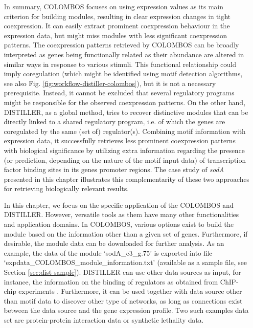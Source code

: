 In summary, COLOMBOS focuses on using expression values as its main criterion
for building modules, resulting in clear expression changes in tight
coexpression. It can easily extract prominent coexpression behaviour in the
expression data, but might miss modules with less significant coexpression
patterns. The coexpression patterns retrieved by COLOMBOS can be broadly
interpreted as genes being functionally related as their abundance are altered
in similar ways in response to various stimuli. This functional relationship
could imply coregulation (which might be identified using motif detection
algorithms, see also Fig. \ref{fig:workflow-distiller-colombos}), but it is not
a necessary prerequisite.
Instead, it cannot be excluded that several regulatory programs might be 
responsible for the observed coexpression patterns.
On the other hand, DISTILLER, as a global method, tries to recover
distinctive modules that can be directly linked to a shared regulatory
program, i.e. of which the genes are coregulated by the same (set of)
regulator(s). Combining motif information with expression data, it
successfully retrieves less prominent coexpression patterns with
biological significance by utilizing extra information regarding the
presence (or prediction, depending on the nature of the motif input
data) of transcription factor binding sites in its genes promoter
regions. The case study of \textit{sodA} presented in this chapter illustrates 
this complementarity of these two approaches for retrieving biologically 
relevant results. 

In this chapter, we focus on the specific application of the COLOMBOS and
DISTILLER.  However, versatile tools as them have many other functionalities
and application domains.
%
In COLOMBOS, various options exist to build the module based on the information
other than a given set of genes.  Furthermore, if desirable, the module data
can be downloaded for further analysis.  As an example, the data of the module
`sodA\_c3\_g.75' is exported into file
`expdata\_COLOMBOS\_module\_information.txt' (available as a sample file, see
Section \ref{sec:dist-sample}).
%
DISTILLER can use other data sources as input, for instance, the information 
on the binding of regulators as obtained from ChIP-chip experiments 
\cite{Lemmens2009, Lemmens2006}.
Furthermore, it can be used together with data source other than motif data to 
discover other type of networks, as long as connections exist between the data 
source and the gene expression profile. 
Two such examples data set are protein-protein interaction data or synthetic
lethality data.



